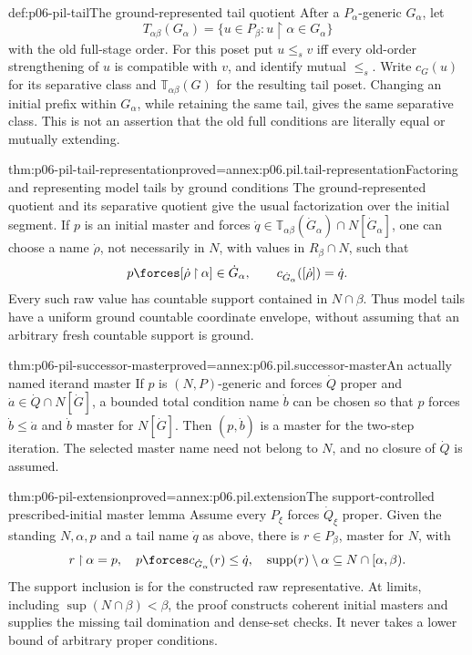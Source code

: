 \begin{hbdefinition}{def:p06-pil-tail}{The ground-represented tail quotient}
After a \(P_\alpha\)-generic \(G_\alpha\), let
\[
 T_{\alpha\beta}(G_\alpha)=
 \{u\in P_\beta:u\mathbin{\upharpoonright}\alpha\in G_\alpha\}
\]
with the old full-stage order. For this poset put \(u\leq_s v\) iff
every old-order strengthening of \(u\) is compatible with \(v\),
and identify mutual \(\leq_s\). Write \(c_G(u)\) for its separative
class and \(\mathbb T_{\alpha\beta}(G)\) for the resulting tail poset.
Changing an initial prefix within \(G_\alpha\), while retaining the
same tail, gives the same separative class. This is not an assertion
that the old full conditions are literally equal or mutually extending.
\end{hbdefinition}

\begin{hblemma}{thm:p06-pil-tail-representation}{proved=annex:p06.pil.tail-representation}{Factoring and representing model tails by ground conditions}
The ground-represented quotient and its separative quotient give the
usual factorization over the initial segment. If \(p\) is an initial
master and forces \(\dot q\in\mathbb T_{\alpha\beta}(\dot G_\alpha)
\cap N[\dot G_\alpha]\), one can choose a name \(\dot\rho\),
not necessarily in \(N\), with values in \(R_\beta\cap N\), such that
\[
 p\forces [\dot\rho\mathbin{\upharpoonright}\alpha]\in\dot G_\alpha,
 \qquad c_{\dot G_\alpha}([\dot\rho])=\dot q.
\]
Every such raw value has countable support contained in \(N\cap\beta\).
Thus model tails have a uniform ground countable coordinate envelope,
without assuming that an arbitrary fresh countable support is ground.
\end{hblemma}

\begin{hblemma}{thm:p06-pil-successor-master}{proved=annex:p06.pil.successor-master}{An actually named iterand master}
If \(p\) is \((N,P)\)-generic and forces \(\dot Q\) proper and
\(\dot a\in\dot Q\cap N[\dot G]\), a bounded total condition name
\(\dot b\) can be chosen so that \(p\) forces \(\dot b\leq\dot a\)
and \(\dot b\) master for \(N[\dot G]\). Then \((p,\dot b)\) is
a master for the two-step iteration. The selected master name need not
belong to \(N\), and no closure of \(\dot Q\) is assumed.
\end{hblemma}

\begin{hbtheorem}{thm:p06-pil-extension}{proved=annex:p06.pil.extension}{The support-controlled prescribed-initial master lemma}
Assume every \(P_\xi\) forces \(\dot Q_\xi\) proper. Given the
standing \(N,\alpha,p\) and a tail name \(\dot q\) as above, there
is \(r\in P_\beta\), master for \(N\), with
\[
 r\mathbin{\upharpoonright}\alpha=p,
 \quad p\forces c_{\dot G_\alpha}(r)\leq\dot q,
 \quad \operatorname{supp}(r)\setminus\alpha\subseteq N\cap[\alpha,\beta).
\]
The support inclusion is for the constructed raw representative.
At limits, including \(\sup(N\cap\beta)<\beta\), the proof constructs
coherent initial masters and supplies the missing tail domination and
dense-set checks. It never takes a lower bound of arbitrary proper
conditions.
\end{hbtheorem}

